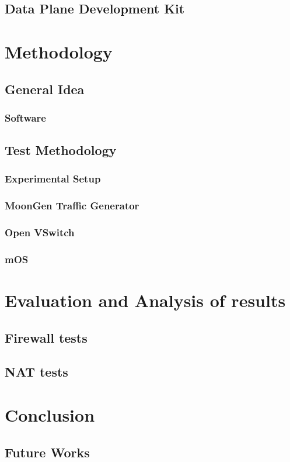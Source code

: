 \documentclass[11pt,a4paper,twoside,openright,bachelor,english]{netthesis}
\begin{document}
\section{Data Plane Development Kit}

\chapter{Methodology}

\section{General Idea}

\subsection{Software}

\section{Test Methodology}

\subsection{Experimental Setup}

\subsection{MoonGen Traffic Generator}

\subsection{Open VSwitch}

\subsection{mOS}

\chapter{Evaluation and Analysis of results}

\section{Firewall tests}

\section{NAT tests}

\chapter{Conclusion}

\section{Future Works}


%
\appendix
%

%





\end{document}
